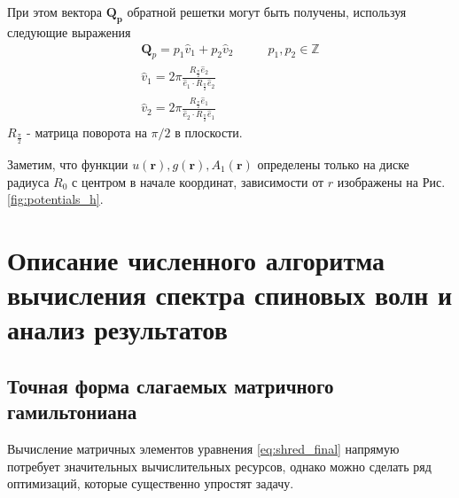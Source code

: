 \documentclass[a4paper,article,14pt]{extarticle}
\begin{document}
При этом вектора $\mathbf{Q_p}$ обратной решетки могут быть получены, используя следующие выражения
\begin{equation}
\begin{aligned}
\mathbf{Q}_p = p_1 \hat {v}_1 + p_2 \hat {v}_2  &\qquad p_1,p_2 \in \mathbb{Z} \\
\hat{v}_1 = 2 \pi  \frac{ R_{\frac \pi 2} \hat {e}_2}{\hat {e}_1   \cdot R_{\frac \pi 2} \hat {e}_2}  \\
\hat{v}_2 =  2 \pi  \frac{ R_{\frac \pi 2} \hat {e}_1}{\hat {e}_2 \cdot R_{\frac \pi 2} \hat {e}_1}
\end{aligned}
\end{equation}
$R_{\frac \pi 2}$ - матрица поворота на $\pi/2$ в плоскости.


Заметим, что функции $u(\mathbf{r}), g(\mathbf{r}), A_1(\mathbf{r})$ определены только на диске радиуса $R_0$ с центром в начале координат, зависимости от $r$ изображены на Рис. \ref{fig:potentials_h}.


\pagebreak

\section{ Описание численного алгоритма вычисления спектра спиновых волн и анализ результатов  }


\subsection{Точная форма слагаемых матричного гамильтониана}
Вычисление матричных элементов уравнения \eqref{eq:shred_final} напрямую потребует значительных вычислительных ресурсов, однако можно сделать ряд оптимизаций, которые существенно упростят задачу. 
\end{document}
